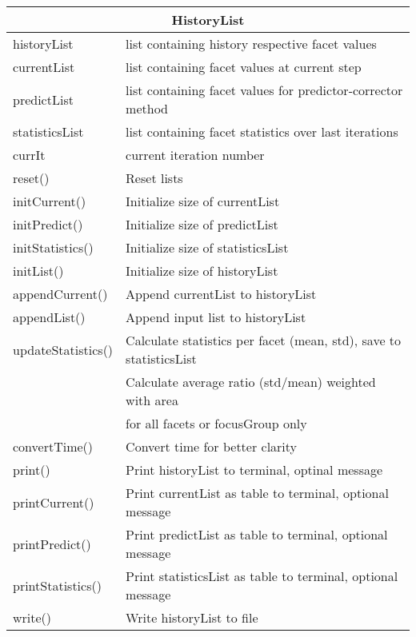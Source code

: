 \begin{center}
\begin{tabular}{|l|l|}
\hline
\multicolumn{2}{|c|}{\rule{0pt}{3ex}HistoryList}\\
\hline
\rule{0pt}{3ex} historyList& list containing history respective facet values\\
\rule{0pt}{3ex} currentList& list containing facet values at current step\\
\rule{0pt}{3ex} predictList& list containing facet values for predictor-corrector method\\
\rule{0pt}{3ex} statisticsList& list containing facet statistics over last iterations\\
\rule{0pt}{3ex} currIt& current iteration number\\
\hline
\rule{0pt}{3ex} reset()& Reset lists\\
\rule{0pt}{3ex} initCurrent()& Initialize size of currentList\\
\rule{0pt}{3ex} initPredict()& Initialize size of predictList\\
\rule{0pt}{3ex} initStatistics()& Initialize size of statisticsList\\
\rule{0pt}{3ex} initList()& Initialize size of historyList\\
\rule{0pt}{3ex} appendCurrent()& Append currentList to historyList\\
\rule{0pt}{3ex} appendList()& Append input list to historyList\\
\rule{0pt}{3ex} updateStatistics()& Calculate statistics per facet (mean, std), save to statisticsList\\
\rule{0pt}{3ex} \multirow{2}{*}{getAverageStatistics()}& Calculate average ratio (std/mean) weighted with area\\ & for all facets or focusGroup only\\
\rule{0pt}{3ex} convertTime()& Convert time for better clarity\\
\rule{0pt}{3ex} print()& Print historyList to terminal, optinal message\\
\rule{0pt}{3ex} printCurrent()& Print currentList as table to terminal, optional message\\
\rule{0pt}{3ex} printPredict()& Print predictList as table to terminal, optional message\\
\rule{0pt}{3ex} printStatistics()& Print statisticsList as table to terminal, optional message\\
\rule{0pt}{3ex} write()& Write historyList to file\\

\end{tabular}
\end{center}
